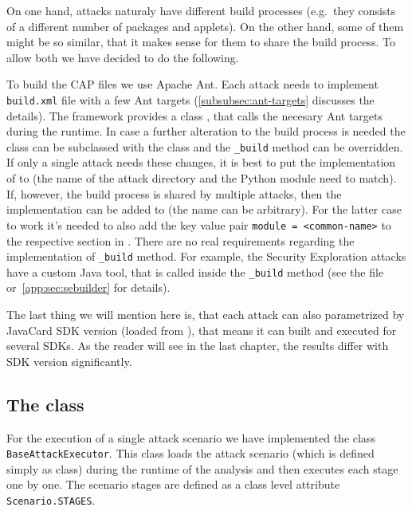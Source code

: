         On one hand, attacks naturaly have different build processes (e.g.\ they consists of a different number of packages and applets). On the other hand, some of them might be so similar, that it makes sense for them to share the build process. To allow both we have decided to do the following.

        To build the CAP files we use Apache Ant. Each attack needs to implement \texttt{build.xml} file with a few Ant targets (\ref{subsubsec:ant-targets} discusses the details). The framework provides a class \builderclass, that calls the necesary Ant targets during the runtime. In case a further alteration to the build process is needed the class \shortbuilderclass can be subclassed with the class \attackbuilder and the \texttt{_build} method can be overridden. If only a single attack needs these changes, it is best to put the implementation of \attackbuilder to  (the name of the attack directory and the Python module need to match).
        If, however, the build process is shared by multiple attacks, then the implementation can be added to  (the name can be arbitrary). For the latter case to work it's needed to also add the key value pair \texttt{module = <common-name>} to the respective section in . There are no real requirements regarding the implementation of \texttt{_build} method. For example, the Security Exploration attacks have a custom Java tool, that is called inside the \texttt{_build} method (see the file  or~\ref{app:sec:sebuilder} for details).

        The last thing we will mention here is, that each attack can also parametrized by JavaCard SDK version (loaded from ), that means it can built and executed for several SDKs. As the reader will see in the last chapter, the results differ with SDK version significantly.

        \subsection{The class \executorclass}\label{subsec:executor:class}
            For the execution of a single attack scenario we have implemented the class \texttt{BaseAttackExecutor}. This class loads the attack scenario (which is defined simply as \scenario class) during the runtime of the analysis and then executes each stage one by one. The scenario stages are defined as a class level attribute \texttt{Scenario.STAGES}.

